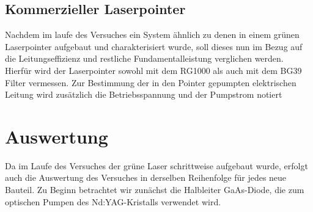 \documentclass[twoside,colorback,accentcolor=tud4c,11pt]{tudreport}
\begin{document}
\section{Kommerzieller Laserpointer}\label{v6}
Nachdem im laufe des Versuches ein System ähnlich zu denen in einem grünen Laserpointer aufgebaut und charakterisiert wurde, soll dieses nun im Bezug auf die Leitungseffizienz und restliche Fundamentalleistung verglichen werden. Hierfür wird der Laserpointer sowohl mit dem RG1000 als auch mit dem BG39 Filter vermessen. Zur Bestimmung der in den Pointer gepumpten elektrischen Leitung wird zusätzlich die Betriebsspannung und der Pumpstrom notiert
  
     	
\chapter{Auswertung}
Da im Laufe des Versuches der grüne Laser schrittweise aufgebaut wurde, erfolgt auch die  Auswertung des Versuches in derselben Reihenfolge für jedes neue Bauteil. Zu Beginn betrachtet wir zunächst die Halbleiter GaAs-Diode, die zum optischen Pumpen des Nd:YAG-Kristalls verwendet wird.
\end{document}
